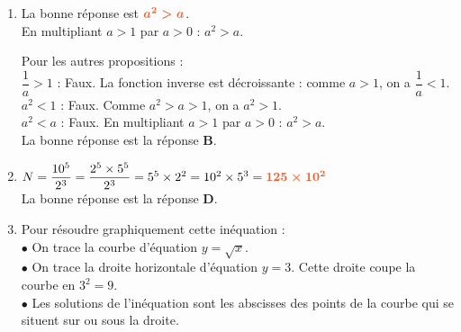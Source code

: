 \documentclass[a4paper,11pt]{article}
\newcounter{seancenum}
\begin{document}
\setcounter{seancenum}{31}
\newpage
\begin{seance}{} %

\begin{enumerate}
\item La bonne réponse est ${\color[HTML]{F15929}\boldsymbol{a^2 > a}}$.\\
En multipliant $a > 1$ par $a > 0$ : $a^2 > a$.

\medskip

Pour les autres propositions :\\
$\dfrac{1}{a} > 1$ : Faux. La fonction inverse est décroissante : comme $a > 1$, on a $\dfrac{1}{a} < 1$.\\
$a^2 < 1$ : Faux. Comme $a^2 > a > 1$, on a $a^2 > 1$.\\
$a^2 < a$ : Faux. En multipliant $a > 1$ par $a > 0$ : $a^2 > a$.\\La bonne réponse est la réponse {\bfseries \color[HTML]{F15929}B}.

\item $ N=\dfrac{10^5}{2^3}=\dfrac{2^5\times 5^5 }{2^3}=5^5\times 2^{2}=10^2\times 5^{3}={\color[HTML]{F15929}\boldsymbol{125\times 10^{2}}}$\\La bonne réponse est la réponse {\bfseries \color[HTML]{F15929}D}.

\item \begin{minipage}[c]{0.6\textwidth}
Pour résoudre graphiquement cette inéquation : \\
            $\bullet$ On trace la courbe d'équation $y=\sqrt{x}$. \\
            $\bullet$ On trace la droite horizontale d'équation $y=3$. Cette droite coupe la courbe en $3^2=9$. \\
            $\bullet$ Les solutions de l'inéquation sont les abscisses des points de la courbe qui se situent sur ou sous la droite.
          

\end{minipage} \hfill \begin{minipage}[c]{0.4\textwidth}
            \begin{tikzpicture}[baseline,scale=0.7]


\end{tikzpicture}
\end{minipage}
\end{enumerate}
\end{seance}
\end{document}

